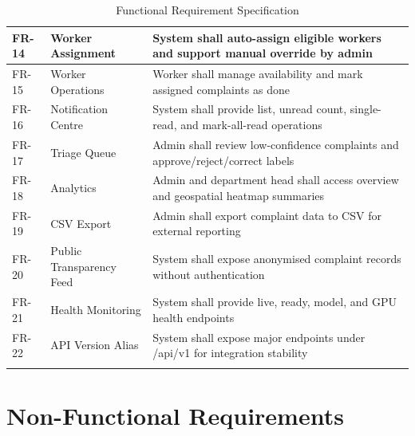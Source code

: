 \begin{xltabular}{\textwidth}{|>{\RaggedRight\arraybackslash}p{0.12\textwidth}|>{\RaggedRight\arraybackslash}p{0.30\textwidth}|>{\RaggedRight\arraybackslash}X|}
FR-14 & Worker Assignment & System shall auto-assign eligible workers and support manual override by admin \\ \hline
FR-15 & Worker Operations & Worker shall manage availability and mark assigned complaints as done \\ \hline
FR-16 & Notification Centre & System shall provide list, unread count, single-read, and mark-all-read operations \\ \hline
FR-17 & Triage Queue & Admin shall review low-confidence complaints and approve/reject/correct labels \\ \hline
FR-18 & Analytics & Admin and department head shall access overview and geospatial heatmap summaries \\ \hline
FR-19 & CSV Export & Admin shall export complaint data to CSV for external reporting \\ \hline
FR-20 & Public Transparency Feed & System shall expose anonymised complaint records without authentication \\ \hline
FR-21 & Health Monitoring & System shall provide live, ready, model, and GPU health endpoints \\ \hline
FR-22 & API Version Alias & System shall expose major endpoints under /api/v1 for integration stability \\ \hline
\caption{Functional Requirement Specification}
\end{xltabular}

\Needspace{0.9\textheight}
\section{Non-Functional Requirements}

